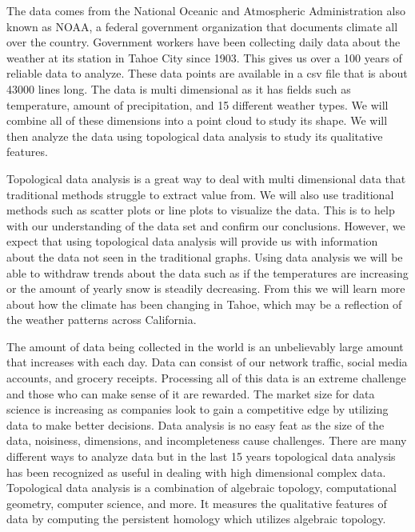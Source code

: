 \documentclass[12pt]{report}
\begin{document}
The data comes from the National Oceanic and Atmospheric Administration also known as NOAA, a federal government organization that documents climate all over the country. Government workers have been collecting daily data about the weather at its station in Tahoe City since 1903. This gives us over a 100 years of reliable data to analyze. These data points are available in a csv file that is about 43000 lines long. The data is multi dimensional as it has fields such as temperature, amount of precipitation, and 15 different weather types. We will combine all of these dimensions into a point cloud to study its shape. We will then analyze the data using topological data analysis to study its qualitative features. 

Topological data analysis is a great way to deal with multi dimensional data that traditional methods struggle to extract value from. We will also use traditional methods such as scatter plots or line plots to visualize the data. This is to help with our understanding of the data set and confirm our conclusions. However, we expect that using topological data analysis will provide us with information about the data not seen in the traditional graphs. Using data analysis we will be able to withdraw trends about the data such as if the temperatures are increasing or the amount of yearly snow is steadily decreasing. From this we will learn more about how the climate has been changing in Tahoe, which may be a reflection of the weather patterns across California. 

The amount of data being collected in the world is an unbelievably large amount that increases with each day. Data can consist of our network traffic, social media accounts, and grocery receipts. Processing all of this data is an extreme challenge and those who can make sense of it are rewarded. The market size for data science is increasing as companies look to gain a competitive edge by utilizing data to make better decisions. Data analysis is no easy feat as the size of the data, noisiness, dimensions, and incompleteness cause challenges. There are many different ways to analyze data but in the last 15 years topological data analysis has been recognized as useful in dealing with high dimensional complex data. Topological data analysis is a combination of algebraic topology, computational geometry, computer science, and more. It measures the qualitative features of data by computing the persistent homology which utilizes algebraic topology.
 
\end{document}
